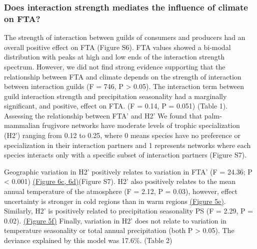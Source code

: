 \documentclass[
]{agujournal2019}
\begin{document}
\subsubsection{Does interaction strength mediates the influence of
climate on
FTA?}\label{does-interaction-strength-mediates-the-influence-of-climate-on-fta}

The strength of interaction between guilds of consumers and producers
had an overall positive effect on FTA (Figure S6). FTA values showed a
bi-modal distribution with peaks at high and low ends of the interaction
strength spectrum. However, we did not find strong evidence supporting
that the relationship between FTA and climate depends on the strength of
interaction between interaction guilds (F = 746, P \textgreater{} 0.05).
The interaction term between guild interaction strength and
precipitation seasonality had a marginally significant, and positive,
effect on FTA. (F = 0.14, P = 0.051) (Table 1). Assessing the
relationship between FTA' and H2' We found that palm-mammalian frugivore
networks have moderate levels of trophic specialization (H2') ranging
from 0.12 to 0.25, where 0 means species have no preference or
specialization in their interaction partners and 1 represents networks
where each species interacts only with a specific subset of interaction
partners (Figure S7).

Geographic variation in H2' positively relates to variation in FTA' (F =
24.36; P \textless{} 0.001) \hyperref[fig-06]{(Figure 6c, 6d)}(Figure
S7). H2' also positively relates to the mean annual temperature of the
atmosphere (F = 2.12, P = 0.03), however, effect uncertainty is stronger
in cold regions than in warm regions \hyperref[fig-05]{(Figure 5e)}.
Similarly, H2' is positively related to precipitation seasonality PS (F
= 2.29, P = 0.02). \hyperref[fig-05]{(Figure 5f)} Finally, variation in
H2' does not relate to variation in temperature seasonality or total
annual precipitation (both P \textgreater{} 0.05). The deviance
explained by this model was 17.6\%. (Table 2)
\end{document}
